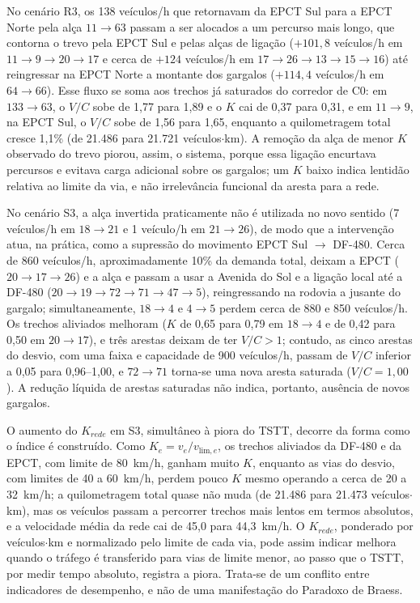\documentclass[portuguese]{sbc2025}%
\begin{document}
No cenário R3, os 138 veículos/h que retornavam da EPCT Sul para a EPCT Norte pela alça $11\rightarrow63$ passam a ser alocados a um percurso mais longo, que contorna o trevo pela EPCT Sul e pelas alças de ligação ($+101{,}8$ veículos/h em $11\rightarrow9\rightarrow20\rightarrow17$ e cerca de $+124$ veículos/h em $17\rightarrow26\rightarrow13\rightarrow15\rightarrow16$) até reingressar na EPCT Norte a montante dos gargalos ($+114{,}4$ veículos/h em $64\rightarrow66$). Esse fluxo se soma aos trechos já saturados do corredor de C0: em $133\rightarrow63$, o $V/C$ sobe de 1,77 para 1,89 e o $K$ cai de 0,37 para 0,31, e em $11\rightarrow9$, na EPCT Sul, o $V/C$ sobe de 1,56 para 1,65, enquanto a quilometragem total cresce 1,1\% (de 21.486 para 21.721 veículos$\cdot$km). A remoção da alça de menor $K$ observado do trevo piorou, assim, o sistema, porque essa ligação encurtava percursos e evitava carga adicional sobre os gargalos; um $K$ baixo indica lentidão relativa ao limite da via, e não irrelevância funcional da aresta para a rede.

No cenário S3, a alça invertida praticamente não é utilizada no novo sentido (7 veículos/h em $18\rightarrow21$ e 1 veículo/h em $21\rightarrow26$), de modo que a intervenção atua, na prática, como a supressão do movimento EPCT Sul $\rightarrow$ DF-480. Cerca de 860 veículos/h, aproximadamente 10\% da demanda total, deixam a EPCT ($20\rightarrow17\rightarrow26$) e a alça e passam a usar a Avenida do Sol e a ligação local até a DF-480 ($20\rightarrow19\rightarrow72\rightarrow71\rightarrow47\rightarrow5$), reingressando na rodovia a jusante do gargalo; simultaneamente, $18\rightarrow4$ e $4\rightarrow5$ perdem cerca de 880 e 850 veículos/h. Os trechos aliviados melhoram ($K$ de 0,65 para 0,79 em $18\rightarrow4$ e de 0,42 para 0,50 em $20\rightarrow17$), e três arestas deixam de ter $V/C>1$; contudo, as cinco arestas do desvio, com uma faixa e capacidade de 900 veículos/h, passam de $V/C$ inferior a 0,05 para 0,96--1,00, e $72\rightarrow71$ torna-se uma nova aresta saturada ($V/C=1{,}00$). A redução líquida de arestas saturadas não indica, portanto, ausência de novos gargalos.

O aumento do $K_{rede}$ em S3, simultâneo à piora do TSTT, decorre da forma como o índice é construído. Como $K_e=v_e/v_{\text{lim},e}$, os trechos aliviados da DF-480 e da EPCT, com limite de 80~km/h, ganham muito $K$, enquanto as vias do desvio, com limites de 40 a 60~km/h, perdem pouco $K$ mesmo operando a cerca de 20 a 32~km/h; a quilometragem total quase não muda (de 21.486 para 21.473 veículos$\cdot$km), mas os veículos passam a percorrer trechos mais lentos em termos absolutos, e a velocidade média da rede cai de 45,0 para 44,3~km/h. O $K_{rede}$, ponderado por veículos$\cdot$km e normalizado pelo limite de cada via, pode assim indicar melhora quando o tráfego é transferido para vias de limite menor, ao passo que o TSTT, por medir tempo absoluto, registra a piora. Trata-se de um conflito entre indicadores de desempenho, e não de uma manifestação do Paradoxo de Braess.
\end{document}
